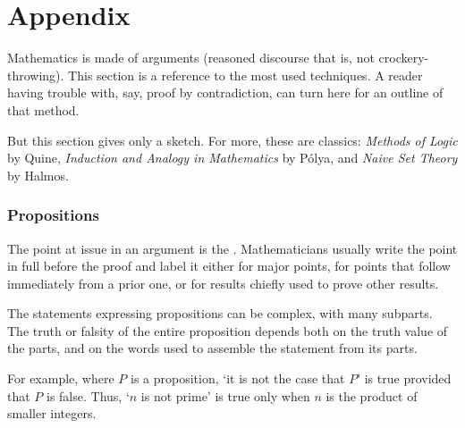 %
%


\newcommand{\appendsection}[1]{\subsection*{#1}
   \addcontentsline{toc}{subsection}{#1}}
\markboth{}{}
\renewcommand{\thepage}{A-\arabic{page}}
\setcounter{page}{1}
\chapter*{Appendix}

Mathematics is made of arguments (reasoned discourse that is,
not crockery-throwing).
This section is a reference to the most used techniques.
A reader having trouble with, say, proof by contradiction, can
turn here for an outline of that method.

But this section gives only a sketch.
For more, these are classics:
{\em Methods of Logic\/} by Quine,
{\em Induction and Analogy in Mathematics\/} by P\'olya, and
{\em Naive Set Theory} by Halmos.




\appendsection{Propositions}
%
The point at issue in an argument is the 
.
Mathematicians usually write the point in full before the proof
and label it either
for major points,
for points that follow immediately from
a prior one, or 
for results chiefly used to prove other results.

The statements expressing propositions can be complex, with many subparts.
The truth or falsity of the entire proposition depends both on the
truth value of the parts, and on the words used to
assemble the statement from its parts.

For example, where \( P \) is a proposition,
`it is not the case that \( P \)' is true provided that \( P \) is
false.
Thus, `\( n \) is not prime' is true only when \( n \) is the
product of smaller integers.

